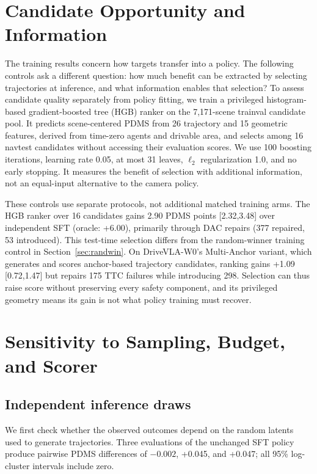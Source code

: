 \documentclass[letterpaper,10pt,conference]{ieeeconf}
\begin{document}
\section{Candidate Opportunity and Information}\label{sec:opportunity}
The training results concern how targets transfer into a policy. The following controls ask a different question: how much benefit can be extracted by selecting trajectories at inference, and what information enables that selection?
To assess candidate quality separately from policy fitting, we train a privileged histogram-based gradient-boosted tree (HGB) ranker on the 7,171-scene trainval candidate pool. It predicts scene-centered PDMS from 26 trajectory and 15 geometric features, derived from time-zero agents and drivable area, and selects among 16 navtest candidates without accessing their evaluation scores. We use 100 boosting iterations, learning rate 0.05, at most 31 leaves, $\ell_2$ regularization 1.0, and no early stopping. It measures the benefit of selection with additional information, not an equal-input alternative to the camera policy.

These controls use separate protocols, not additional matched training arms. The HGB ranker over 16 candidates gains 2.90 PDMS points [2.32,3.48] over independent SFT (oracle: +6.00), primarily through DAC repairs (377 repaired, 53 introduced). This test-time selection differs from the random-winner training control in Section~\ref{sec:randwin}. On DriveVLA-W0's Multi-Anchor variant, which generates and scores anchor-based trajectory candidates, ranking gains +1.09 [0.72,1.47] but repairs 175 TTC failures while introducing 298. Selection can thus raise score without preserving every safety component, and its privileged geometry means its gain is not what policy training must recover.

\section{Sensitivity to Sampling, Budget, and Scorer}

\subsection{Independent inference draws}
We first check whether the observed outcomes depend on
the random latents used to generate trajectories.
Three evaluations of the unchanged SFT policy produce
pairwise PDMS differences of $-0.002$, +0.045, and +0.047;
all 95\% log-cluster intervals include zero.
\end{document}
